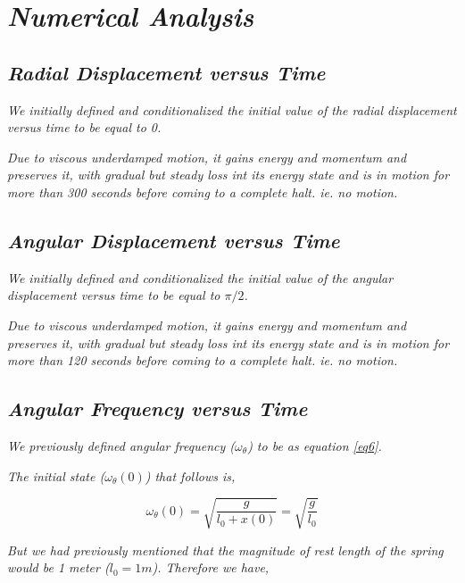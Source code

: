 \section{\textit{Numerical Analysis}}
        
    \subsection{\textit{Radial Displacement versus Time}}
            
                \textit{We initially defined and conditionalized the initial value of the radial displacement versus time to be equal to 0.}
                
                \textit{Due to viscous underdamped motion, it gains energy and momentum and preserves it, with gradual but steady loss int its energy state and is in motion for more than 300 seconds before coming to a complete halt. ie. no motion.}
    
    \subsection{\textit{Angular Displacement versus Time}}
            
                \textit{We initially defined and conditionalized the initial value of the angular displacement versus time to be equal to $\pi/2$.}
                
                \textit{Due to viscous underdamped motion, it gains energy and momentum and preserves it, with gradual but steady loss int its energy state and is in motion for more than 120 seconds before coming to a complete halt. ie. no motion.}
    
                
    \subsection{\textit{Angular Frequency versus Time}}
                
                \textit{We previously defined angular frequency ($\omega_\theta$) to be as equation \ref{eq6}.}
                
                \textit{The initial state ($\omega_\theta(0)$) that follows is,}
                
                $$\omega_\theta(0) = \sqrt{\frac{g}{l_0 + x(0)}} = \sqrt{\frac{g}{l_0}}$$
                
                \textit{But we had previously mentioned that the magnitude of rest length of the spring would be 1 meter ($l_0 = 1 m$). Therefore we have,}
                
